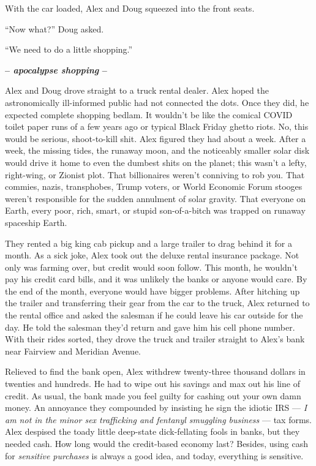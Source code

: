 With the car loaded, Alex and Doug squeezed into the front seats.

``Now what?'' Doug asked.

``We need to do a little shopping.''

\begin{center}\large\textbf{-- \emph{apocalypse shopping} --}\normalsize\end{center}

Alex and Doug drove straight to a truck rental dealer. Alex hoped the
astronomically ill-informed public had not connected the dots. Once they
did, he expected complete shopping bedlam. It wouldn't be like the
comical COVID toilet paper runs of a few years ago or typical Black
Friday ghetto riots. No, this would be serious, shoot-to-kill shit. Alex
figured they had about a week. After a week, the missing tides, the
runaway moon, and the noticeably smaller solar disk would drive it home
to even the dumbest shits on the planet; this wasn't a lefty,
right-wing, or Zionist plot. That billionaires weren't conniving to rob
you. That commies, nazis, transphobes, Trump voters, or World Economic
Forum stooges weren't responsible for the sudden annulment of solar
gravity. That everyone on Earth, every poor, rich, smart, or stupid
son-of-a-bitch was trapped on runaway spaceship Earth.

They rented a big king cab pickup and a large trailer to drag behind it
for a month. As a sick joke, Alex took out the deluxe rental insurance
package. Not only was farming over, but credit would soon follow. This
month, he wouldn't pay his credit card bills, and it was unlikely the
banks or anyone would care. By the end of the month, everyone would have
bigger problems. After hitching up the trailer and transferring their
gear from the car to the truck, Alex returned to the rental office and
asked the salesman if he could leave his car outside for the day. He
told the salesman they'd return and gave him his cell phone number. With
their rides sorted, they drove the truck and trailer straight to Alex's
bank near Fairview and Meridian Avenue.

Relieved to find the bank open, Alex withdrew twenty-three thousand
dollars in twenties and hundreds. He had to wipe out his savings and max
out his line of credit. As usual, the bank made you feel guilty for
cashing out your own damn money. An annoyance they compounded by
insisting he sign the idiotic IRS --- \emph{I am not in the minor sex
trafficking and fentanyl smuggling business} --- tax forms. Alex
despised the toady little deep-state dick-fellating fools in banks, but
they needed cash. How long would the credit-based economy last? Besides,
using cash for \emph{sensitive purchases} is always a good idea, and
today, everything is sensitive.

